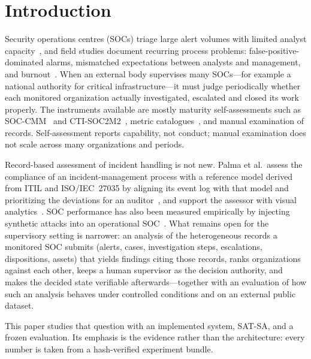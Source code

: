 \section{Introduction}
\label{sec:intro}

Security operations centres (SOCs) triage large alert volumes with limited analyst
capacity~\cite{vielberth2020soc,tariq2025alertfatigue}, and field studies document
recurring process problems: false-positive-dominated alarms, mismatched expectations
between analysts and management, and burnout~\cite{alahmadi2022falsepositives,kokulu2019soc,sundaramurthy2015burnout}.
When an external body supervises many SOCs---for example a national authority for
critical infrastructure---it must judge periodically whether each monitored
organization actually investigated, escalated and closed its work properly. The
instruments available are mostly maturity self-assessments such as
SOC-CMM~\cite{vanos2016soccmm} and CTI-SOC2M2~\cite{schlette2021ctisoc2m2}, metric
catalogues~\cite{forsberg2023metrics,agyepong2023analyst}, and manual examination of
records. Self-assessment reports capability, not conduct; manual examination does not
scale across many organizations and periods.

Record-based assessment of incident handling is not new. Palma et al.\ assess the
compliance of an incident-management process with a reference model derived from
ITIL and ISO/IEC~27035 by aligning its event log with that model and prioritizing
the deviations for an auditor~\cite{palma2024compliance,palma2024benchimp}, and
support the assessor with visual analytics~\cite{palma2024eurova,palma2025impavid}.
SOC performance has also been measured empirically by injecting synthetic attacks
into an operational SOC~\cite{rosso2020saibersoc}. What remains open for the
supervisory setting is narrower: an analysis of the heterogeneous records a monitored
SOC submits (alerts, cases, investigation steps, escalations, dispositions, assets)
that yields findings citing those records, ranks organizations against each other,
keeps a human supervisor as the decision authority, and makes the decided state
verifiable afterwards---together with an evaluation of how such an analysis
behaves under controlled conditions and on an external public dataset.

This paper studies that question with an implemented system, SAT-SA, and a frozen evaluation. Its emphasis is
the evidence rather than the architecture: every number is taken from a hash-verified
experiment bundle.

